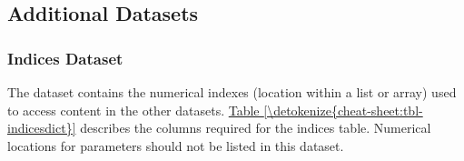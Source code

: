 \documentclass[letterpaper,10pt,english]{sphinxmanual}
\begin{document}
\subsection{Additional Datasets}
\label{\detokenize{cheat-sheet:additional-datasets}}

\subsubsection{Indices Dataset}
\label{\detokenize{cheat-sheet:indices-dataset}}
\sphinxAtStartPar
The  dataset contains the numerical indexes (location within a list or array) used to access content in the other datasets. \hyperref[\detokenize{cheat-sheet:tbl-indicesdict}]{Table \ref{\detokenize{cheat-sheet:tbl-indicesdict}}} describes the columns required for the indices table. Numerical locations for parameters should not be listed in this dataset.
\end{document}
